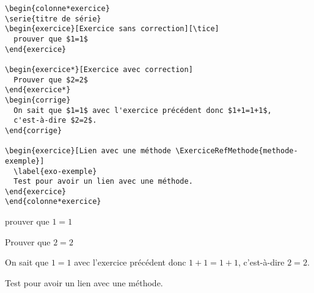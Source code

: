 \documentclass[nocrop]{sesamanuel}
\begin{document}
\begin{code}
\begin{verbatim}
\begin{colonne*exercice}
\serie{titre de série}
\begin{exercice}[Exercice sans correction][\tice]
  prouver que $1=1$
\end{exercice}

\begin{exercice*}[Exercice avec correction]
  Prouver que $2=2$
\end{exercice*}
\begin{corrige}
  On sait que $1=1$ avec l'exercice précédent donc $1+1=1+1$,
  c'est-à-dire $2=2$.
\end{corrige}

\begin{exercice}[Lien avec une méthode \ExerciceRefMethode{methode-exemple}]
  \label{exo-exemple}
  Test pour avoir un lien avec une méthode.
\end{exercice}
\end{colonne*exercice}
\end{verbatim}
\end{code}
\begin{result}

\end{result}
\begingroup
\simuleexercicesbase
\begin{colonne*exercice}
\begin{exercice}
  prouver que $1=1$
\end{exercice}

\begin{exercice*}
  Prouver que $2=2$
\end{exercice*}
\begin{corrige}
  On sait que $1=1$ avec l'exercice précédent donc $1+1=1+1$,
  c'est-à-dire $2=2$.
\end{corrige}

\begin{exercice}
  \label{exo-exemple}
  Test pour avoir un lien avec une méthode.
\end{exercice}
\end{colonne*exercice}
\endgroup
\end{document}
